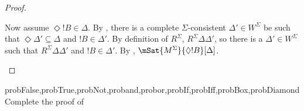 \documentclass[../../../include/open-logic-section]{subfiles}
\begin{document}
\begin{proof}
\begin{enumerate}
{{{          Now assume $\Diamond !B \in \Delta$. By
          , there is a complete
          $\Sigma$-consistent $\Delta' \in W^\Sigma$ be such that
          $\Diamond \Delta' \subseteq \Delta$ and $!B \in
          \Delta'$. By
          definition of $R^\Sigma$, $R^\Sigma \Delta\Delta'$, so there
          is a $\Delta' \in W^\Sigma$ such that $R^\Sigma
          \Delta\Delta'$ and $!B \in \Delta'$. By
          , $\mSat{M^\Sigma}{\Diamond
            !B}[\Delta]$.}}}{}
  \end{enumerate}
\end{proof}

\begin{probtag}{probFalse,probTrue,probNot,proband,probor,probIf,probIff,probBox,probDiamond}
  Complete the proof of 
\end{probtag}
\end{document}
